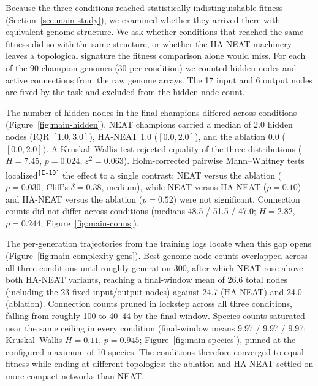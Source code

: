 \documentclass[12pt]{article}
\newcommand{\revID}[1]{\textsuperscript{\scriptsize\texttt{[#1]}}}
\newcommand{\revBrit}[2]{\textcolor{lrBlue}{#2}\revID{#1}}      %
\begin{document}
Because the three conditions reached statistically indistinguishable fitness (Section~\ref{sec:main-study}), we examined whether they arrived there with equivalent genome structure.
We ask whether conditions that reached the same fitness did so with the same structure, or whether the HA-NEAT machinery leaves a topological signature the fitness comparison alone would miss.
For each of the 90 champion genomes (30 per condition) we counted hidden nodes and active connections from the raw genome arrays.
The 17 input and 6 output nodes are fixed by the task and excluded from the hidden-node count.

The number of hidden nodes in the final champions differed across conditions (Figure~\ref{fig:main-hidden}).
NEAT champions carried a median of 2.0 hidden nodes (IQR $[1.0, 3.0]$), HA-NEAT 1.0 ($[0.0, 2.0]$), and the ablation 0.0 ($[0.0, 2.0]$). A Kruskal--Wallis test rejected equality of the three distributions ($H = 7.45$, $p = 0.024$, $\varepsilon^2 = 0.063$).
Holm-corrected pairwise Mann--Whitney tests \revBrit{E-10}{localized} the effect to a single contrast: NEAT versus the ablation ($p = 0.030$, Cliff's $\delta = 0.38$, medium), while NEAT versus HA-NEAT ($p = 0.10$) and HA-NEAT versus the ablation ($p = 0.52$) were not significant.
Connection counts did not differ across conditions (medians 48.5 / 51.5 / 47.0; $H = 2.82$, $p = 0.244$; Figure~\ref{fig:main-conns}).

The per-generation trajectories from the training logs locate when this gap opens (Figure~\ref{fig:main-complexity-gens}).
Best-genome node counts overlapped across all three conditions until roughly generation 300, after which NEAT rose above both HA-NEAT variants, reaching a final-window mean of 26.6 total nodes (including the 23 fixed input/output nodes) against 24.7 (HA-NEAT) and 24.0 (ablation).
Connection counts pruned in lockstep across all three conditions, falling from roughly 100 to 40--44 by the final window.
Species counts saturated near the same ceiling in every condition (final-window means 9.97 / 9.97 / 9.97; Kruskal--Wallis $H = 0.11$, $p = 0.945$; Figure~\ref{fig:main-species}), pinned at the configured maximum of 10 species.
The conditions therefore converged to equal fitness while ending at different topologies: the ablation and HA-NEAT settled on more compact networks than NEAT.
\end{document}
